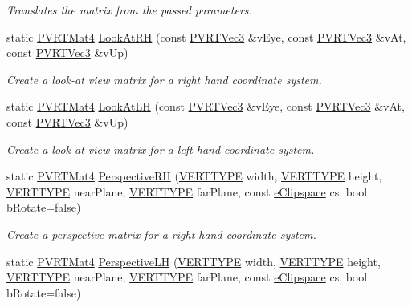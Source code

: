 \begin{DoxyCompactItemize}
\begin{DoxyCompactList}\small\item\em Translates the matrix from the passed parameters. \end{DoxyCompactList}\item 
static \hyperlink{struct_p_v_r_t_mat4}{P\+V\+R\+T\+Mat4} \hyperlink{struct_p_v_r_t_mat4_a2c91f861b78d38e0f9ea3c6728a0b03a}{Look\+At\+R\+H} (const \hyperlink{struct_p_v_r_t_vec3}{P\+V\+R\+T\+Vec3} \&v\+Eye, const \hyperlink{struct_p_v_r_t_vec3}{P\+V\+R\+T\+Vec3} \&v\+At, const \hyperlink{struct_p_v_r_t_vec3}{P\+V\+R\+T\+Vec3} \&v\+Up)
\begin{DoxyCompactList}\small\item\em Create a look-\/at view matrix for a right hand coordinate system. \end{DoxyCompactList}\item 
static \hyperlink{struct_p_v_r_t_mat4}{P\+V\+R\+T\+Mat4} \hyperlink{struct_p_v_r_t_mat4_a957545a141e531a3e4ce9e3b7d59582f}{Look\+At\+L\+H} (const \hyperlink{struct_p_v_r_t_vec3}{P\+V\+R\+T\+Vec3} \&v\+Eye, const \hyperlink{struct_p_v_r_t_vec3}{P\+V\+R\+T\+Vec3} \&v\+At, const \hyperlink{struct_p_v_r_t_vec3}{P\+V\+R\+T\+Vec3} \&v\+Up)
\begin{DoxyCompactList}\small\item\em Create a look-\/at view matrix for a left hand coordinate system. \end{DoxyCompactList}\item 
static \hyperlink{struct_p_v_r_t_mat4}{P\+V\+R\+T\+Mat4} \hyperlink{struct_p_v_r_t_mat4_ac51a655a779a5f3c2df50831858eb4dc}{Perspective\+R\+H} (\hyperlink{group___a_p_i___o_g_l_e_s_ga06da457b7d3e93368ab904f89e1396be}{V\+E\+R\+T\+T\+Y\+P\+E} width, \hyperlink{group___a_p_i___o_g_l_e_s_ga06da457b7d3e93368ab904f89e1396be}{V\+E\+R\+T\+T\+Y\+P\+E} height, \hyperlink{group___a_p_i___o_g_l_e_s_ga06da457b7d3e93368ab904f89e1396be}{V\+E\+R\+T\+T\+Y\+P\+E} near\+Plane, \hyperlink{group___a_p_i___o_g_l_e_s_ga06da457b7d3e93368ab904f89e1396be}{V\+E\+R\+T\+T\+Y\+P\+E} far\+Plane, const \hyperlink{struct_p_v_r_t_mat4_aad804cddb0d3f6799550aaa703d71e96}{e\+Clipspace} cs, bool b\+Rotate=false)
\begin{DoxyCompactList}\small\item\em Create a perspective matrix for a right hand coordinate system. \end{DoxyCompactList}\item 
static \hyperlink{struct_p_v_r_t_mat4}{P\+V\+R\+T\+Mat4} \hyperlink{struct_p_v_r_t_mat4_a445973370397d8284d9ea27d19e83248}{Perspective\+L\+H} (\hyperlink{group___a_p_i___o_g_l_e_s_ga06da457b7d3e93368ab904f89e1396be}{V\+E\+R\+T\+T\+Y\+P\+E} width, \hyperlink{group___a_p_i___o_g_l_e_s_ga06da457b7d3e93368ab904f89e1396be}{V\+E\+R\+T\+T\+Y\+P\+E} height, \hyperlink{group___a_p_i___o_g_l_e_s_ga06da457b7d3e93368ab904f89e1396be}{V\+E\+R\+T\+T\+Y\+P\+E} near\+Plane, \hyperlink{group___a_p_i___o_g_l_e_s_ga06da457b7d3e93368ab904f89e1396be}{V\+E\+R\+T\+T\+Y\+P\+E} far\+Plane, const \hyperlink{struct_p_v_r_t_mat4_aad804cddb0d3f6799550aaa703d71e96}{e\+Clipspace} cs, bool b\+Rotate=false)

\end{DoxyCompactItemize}
